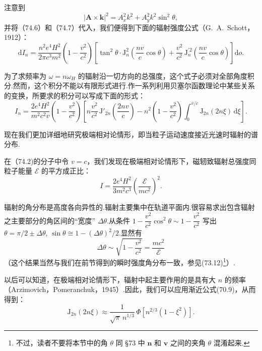 注意到
\begin{equation*}
  |\boldsymbol{A}\times\boldsymbol{k}|^2=A_x^2k^2+A_y^2k^2\sin^2\theta,
\end{equation*}
并将（74.6）和（74.7）代入，我们便得到下面的辐射强度公式（G.~A.~Schott，1912）：
\begin{equation}
  \mathrm{d}I_n=\frac{n^2e^4H^2}{2\pi c^3m^2}\left(1-\frac{v^2}{c^2}\right)
  \left[\tan^2\theta\cdot\mathrm{J}_n^2\!\left(\frac{nv}{c}\cos\theta\right)
  +\frac{v^2}{c^2}\,\mathrm{J}_n^{\prime 2}\!\left(\frac{nv}{c}\cos\theta\right)\right]\mathrm{d}o.
\end{equation}

为了求频率为 $\omega=n\omega_H$ 的辐射沿一切方向的总强度，这个式子必须对全部角度积分.然而，这个积分不能以有限形式进行.作一系列利用贝塞尔函数理论中某些关系的变换，所要求的积分可以写成下面的形式：
\begin{equation}
  I_n=\frac{2e^4H^2}{m^2c^2v}\left(1-\frac{v^2}{c^2}\right)
  \left[n\frac{v^2}{c^2}\,\mathrm{J}'_{2n}\!\left(\frac{2nv}{c}\right)
  -n^2\left(1-\frac{v^2}{c^2}\right)\int_0^{v/c}\mathrm{J}_{2n}(2n\xi)\,\mathrm{d}\xi\right].
\end{equation}

现在我们更加详细地研究极端相对论情形，即当粒子运动速度接近光速时辐射的谱分布.

在（74.2)的分子中令 $v=c$，我们发现在极端相对论情形下，磁轫致辐射总强度同粒子能量 $\mathcal{E}$ 的平方成正比：
\begin{equation}
  I=\frac{2e^4H^2}{3m^2c^3}\left(\frac{\mathcal{E}}{mc^2}\right)^2.
\end{equation}

辐射的角分布是高度各向异性的.辐射主要集中在轨道平面内.很容易求出包含辐射之主要部分的角区间的“宽度” $\Delta\theta$.从条件
$1-\dfrac{v^2}{c^2}\cos^2\theta\sim 1-\dfrac{v^2}{c^2}$
写出 $\theta=\pi/2\pm\Delta\theta$, $\sin\theta\cong 1-(\Delta\theta)^2/2$.显然有
\begin{equation}
  \Delta\theta\sim\sqrt{1-\frac{v^2}{c^2}}=\frac{mc^2}{\mathcal{E}}
\end{equation}
（这个结果当然与我们在前节得到的瞬时强度角分布一致，参见(73.12)\footnote{不过，读者不要将本节中的角 $\theta$ 同 §73 中 $\boldsymbol{n}$ 和 $\boldsymbol{v}$ 之间的夹角 $\theta$ 混淆起来.}）.

以后可以知道，在极端相对论情形下，辐射中起主要作用的是具有大 $n$ 的频率（Arzimovich，Pomeranchuk，1945）.因此，我们可以应用渐近公式(70.9)，从而得到：
\begin{equation}
  \mathrm{J}_{2n}(2n\xi)\approx\frac{1}{\sqrt{\pi}\,n^{1/3}}\,\Phi\!\left[n^{2/3}(1-\xi^2)\right].
\end{equation}

